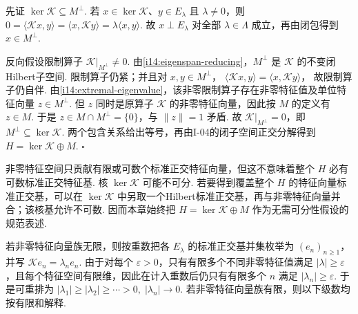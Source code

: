 \begin{FAProof}
先证 \(\displaystyle \ker\mathcal K\subseteq M^\perp\). 若 \(\displaystyle x\in\ker\mathcal K\)、\(\displaystyle y\in E_\lambda\) 且 \(\displaystyle \lambda\neq0\)，则
\(\displaystyle 0 = \langle\mathcal Kx,y\rangle = \langle x,\mathcal Ky\rangle = \lambda\langle x,y\rangle\).
故 \(\displaystyle x\perp E_\lambda\) 对全部 \(\displaystyle \lambda\in\Lambda\) 成立，再由闭包得到 \(\displaystyle x\in M^\perp\).

反向假设限制算子 \(\displaystyle \mathcal K|_{M^\perp}\neq0\). 由\autoref{i14:eigenspan-reducing}，\(\displaystyle M^\perp\) 是 \(\displaystyle \mathcal K\) 的不变闭Hilbert子空间. 限制算子仍紧；并且对 \(\displaystyle x,y\in M^\perp\)，
\(\displaystyle \langle\mathcal Kx,y\rangle = \langle x,\mathcal Ky\rangle\)，
故限制算子仍自伴. 由\autoref{i14:extremal-eigenvalue}，该非零限制算子存在非零特征值及单位特征向量 \(\displaystyle z\in M^\perp\). 但 \(\displaystyle z\) 同时是原算子 \(\displaystyle \mathcal K\) 的非零特征向量，因此按 \(\displaystyle M\) 的定义有 \(\displaystyle z\in M\). 于是 \(\displaystyle z\in M\cap M^\perp=\{0\}\)，与 \(\displaystyle \|z\|=1\) 矛盾. 故 \(\displaystyle \mathcal K|_{M^\perp}=0\)，即 \(\displaystyle M^\perp\subseteq\ker\mathcal K\). 两个包含关系给出等号，再由I-04的闭子空间正交分解得到 \(\displaystyle H=\ker\mathcal K\oplus M\).
\hfill\(\square\)
\end{FAProof}

\begin{FAWarning}[不可分核的边界]
非零特征空间只贡献有限或可数个标准正交特征向量，但这不意味着整个 \(\displaystyle H\) 必有可数标准正交特征基. 核 \(\displaystyle \ker\mathcal K\) 可能不可分. 若要得到覆盖整个 \(\displaystyle H\) 的特征向量标准正交基，可以在 \(\displaystyle \ker\mathcal K\) 中另取一个Hilbert标准正交基，再与非零特征向量并合；该核基允许不可数. 因而本章始终把
\(\displaystyle H = \ker\mathcal K \oplus M\)
作为无需可分性假设的规范表述.
\end{FAWarning}

若非零特征向量族无限，则按重数把各 \(\displaystyle E_\lambda\) 的标准正交基并集枚举为 \(\displaystyle (e_n)_{n\geqslant1}\)，并写
\(\displaystyle \mathcal Ke_n = \lambda_ne_n\).
由于对每个 \(\displaystyle \varepsilon>0\)，只有有限多个不同非零特征值满足 \(\displaystyle |\lambda|\geqslant\varepsilon\)，且每个特征空间有限维，因此在计入重数后仍只有有限多个 \(\displaystyle n\) 满足 \(\displaystyle |\lambda_n|\geqslant\varepsilon\). 于是可重排为
\(\displaystyle |\lambda_1| \geqslant |\lambda_2| \geqslant \cdots >0, \; |\lambda_n| \to0\).
若非零特征向量族有限，则以下级数均按有限和解释.

